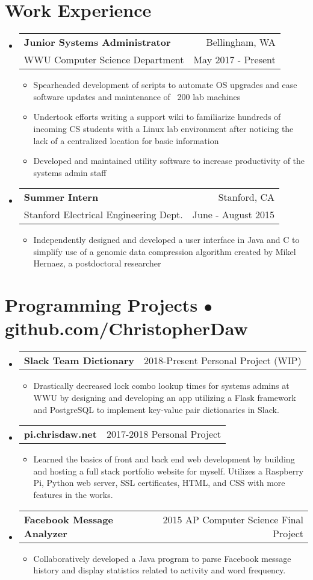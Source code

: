 \documentclass[12pt, letterpaper]{article}
\makeatletter
\newcommand{\resumeItem}[1]{
  \item[$\bullet$]{
    #1 \vspace{-2pt}
  }
}
\newcommand{\resumeSubsection}[4]{
  \vspace{-4pt}\item[]
    \begin{tabular*}{0.97\textwidth}{@{\extracolsep{\fill}} l r}
      \textbf{#1} & #2 \vspace{1pt} \\
      #3 & #4 \\
    \end{tabular*}\vspace{-5pt}
}
\newcommand{\resumeProject}[3]{
  \vspace{-4pt}\item[]
    \begin{tabular*}{0.97\textwidth}{@{\extracolsep{\fill}} l r}
      \textbf{#1} & #2 \\
    \end{tabular*}\vspace{-7pt}
    \begin{itemize}
        \item[] #3
    \end{itemize}\vspace{-5pt}
}
\makeatother
\begin{document}
\section{Work Experience}
  \begin{itemize}[leftmargin=*]
    \resumeSubsection
      {Junior Systems Administrator}{Bellingham, WA}
      {WWU Computer Science Department}{May 2017 - Present}
      \begin{itemize}
        \resumeItem{
          Spearheaded development of scripts to automate OS upgrades and ease software updates and maintenance of ~200 lab machines}
        \resumeItem{
            Undertook efforts writing a support wiki to familiarize hundreds of incoming CS students with a Linux lab environment after noticing the lack of a centralized location for basic information}
        \resumeItem{
            Developed and maintained utility software to increase productivity of the systems admin staff}
      \end{itemize}

    \resumeSubsection
      {Summer Intern}{Stanford, CA}
      {Stanford Electrical Engineering Dept.}{June - August 2015}
      \begin{itemize}
        \resumeItem{
            Independently designed and developed a user interface in Java and C to simplify use of a genomic data compression algorithm created by Mikel Hernaez, a postdoctoral researcher}
      \end{itemize}
    \end{itemize}

\section{Programming Projects $\bullet$ github.com/ChristopherDaw}
  \begin{itemize}[leftmargin=*]
    \resumeProject
      {Slack Team Dictionary}{2018-Present Personal Project (WIP)}
      {Drastically decreased lock combo lookup times for systems admins at WWU by designing and developing an app utilizing a Flask framework and PostgreSQL to implement key-value pair  dictionaries in Slack.}
  \resumeProject
      {pi.chrisdaw.net}{2017-2018 Personal Project}
      {Learned the basics of front and back end web development by building and hosting a full stack portfolio website for myself. Utilizes a Raspberry Pi, Python web server, SSL certificates, HTML, and CSS with more features in the works.}
  \resumeProject
      {Facebook Message Analyzer}{2015 AP Computer Science Final Project}
      {Collaboratively developed a Java program to parse Facebook message history and display statistics related to activity and word frequency.}
  \end{itemize}\vspace{-15pt}
\end{document}
